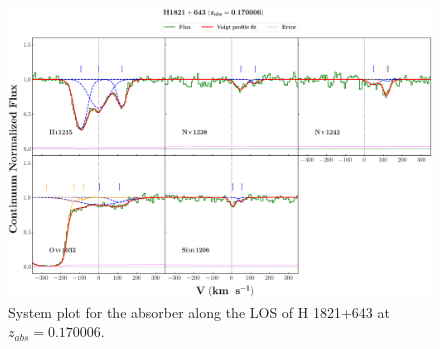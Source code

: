   \begin{landscape}
  
  \begin{figure}
      \centering
      \vspace{-10mm}
      \hspace*{-20mm}
      \includegraphics[width=1.1\linewidth]{System-Plots/H1821+643_z=0.170006_sys_plot.png}
      \caption{System plot for the absorber along the LOS of H 1821+643 at $z_{abs} = 0.170006$. }
  \end{figure}
  
  \end{landscape}
  

